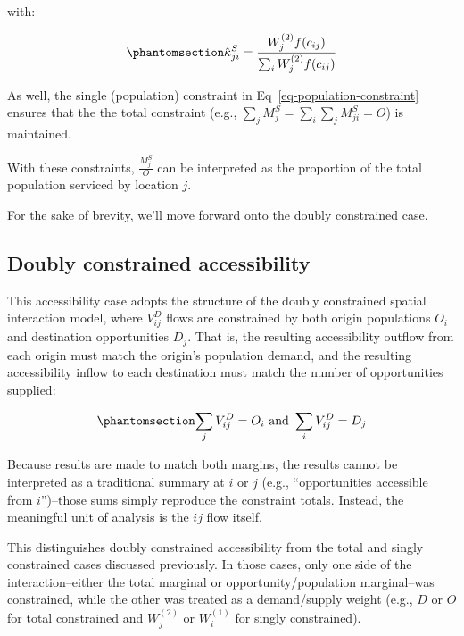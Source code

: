 \documentclass[
  10pt,
  letterpaper,
]{article}
\begin{document}
\noindent with:

\begin{equation}\phantomsection\label{eq-attraction-constrained-proportional-allocation-factor}{
\hat \kappa^S_{ji} = \frac{W_j^{(2)} f(c_{ij})}{\sum_i W_j^{(2)} f(c_{ij})}
}\end{equation}

As well, the single (population) constraint in
Eq~\ref{eq-population-constraint} ensures that the the total constraint
(e.g., \(\sum_j M^S_{j} = \sum_i\sum_j  M^S_{ji} = O\)) is maintained.

With these constraints, \(\frac{M_j^S}{O}\) can be interpreted as the
proportion of the total population serviced by location \(j\).

For the sake of brevity, we'll move forward onto the doubly constrained
case.

\subsection{Doubly constrained
accessibility}\label{doubly-constrained-accessibility}

This accessibility case adopts the structure of the doubly constrained
spatial interaction model, where \(V_{ij}^D\) flows are constrained by
both origin populations \(O_i\) and destination opportunities \(D_j\).
That is, the resulting accessibility outflow from each origin must match
the origin's population demand, and the resulting accessibility inflow
to each destination must match the number of opportunities supplied:

\begin{equation}\phantomsection\label{eq-opportunity-population-equality-1}{
\sum_j V_{ij}^D = O_i \text{ and }  \sum_i V_{ij}^D =  D_j
}\end{equation}

Because results are made to match both margins, the results cannot be
interpreted as a traditional summary at \(i\) or \(j\) (e.g.,
``opportunities accessible from \(i\)'')--those sums simply reproduce
the constraint totals. Instead, the meaningful unit of analysis is the
\(ij\) flow itself.

This distinguishes doubly constrained accessibility from the total and
singly constrained cases discussed previously. In those cases, only one
side of the interaction--either the total marginal or
opportunity/population marginal--was constrained, while the other was
treated as a demand/supply weight (e.g., \(D\) or \(O\) for total
constrained and \(W_j^{(2)}\) or \(W_i^{(1)}\) for singly constrained).
\end{document}
